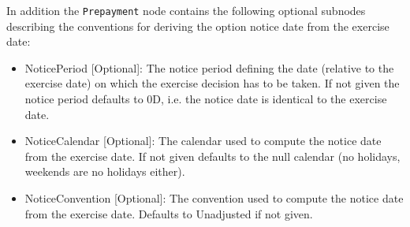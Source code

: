 In addition the \verb+Prepayment+ node contains the following optional subnodes describing the conventions for deriving
the option notice date from the exercise date:

\begin{itemize}
\item NoticePeriod [Optional]: The notice period defining the date (relative to the exercise date) on which the exercise
  decision has to be taken. If not given the notice period defaults to 0D, i.e. the notice date is identical to the
  exercise date.
\item NoticeCalendar [Optional]: The calendar used to compute the notice date from the exercise date. If not given
  defaults to the null calendar (no holidays, weekends are no holidays either).
\item NoticeConvention [Optional]: The convention used to compute the notice date from the exercise date. Defaults to
  Unadjusted if not given.
\end{itemize}
